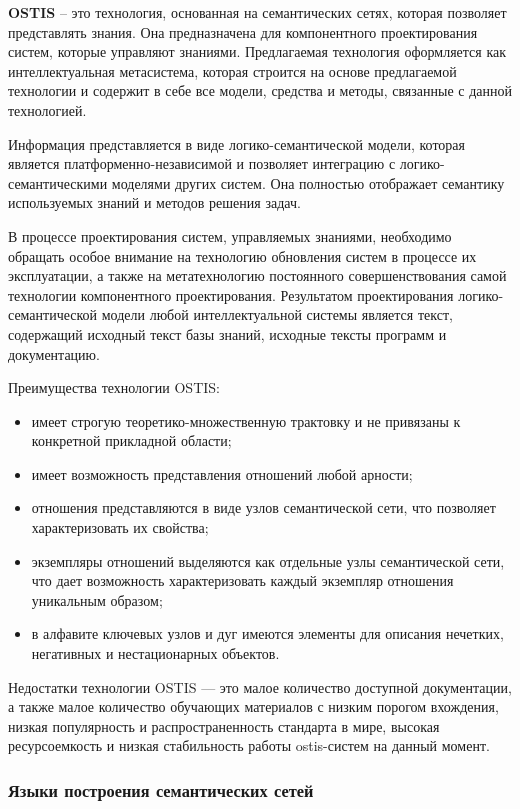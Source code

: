 \textbf{OSTIS} -- это технология, основанная на семантических сетях, которая позволяет представлять знания. Она предназначена для компонентного проектирования систем, которые управляют знаниями. Предлагаемая технология оформляется как интеллектуальная метасистема, которая строится на основе предлагаемой технологии и содержит в себе все модели, средства и методы, связанные с данной технологией.

Информация представляется в виде логико-семантической модели, которая является платформенно-независимой и позволяет интеграцию с логико-семантическими моделями других систем. Она полностью отображает семантику используемых знаний и методов решения задач.

В процессе проектирования систем, управляемых знаниями, необходимо обращать особое внимание на технологию обновления систем в процессе их эксплуатации, а также на метатехнологию постоянного совершенствования самой технологии компонентного проектирования. Результатом проектирования логико-семантической модели любой интеллектуальной системы является текст, содержащий исходный текст базы знаний, исходные тексты программ и документацию. \cite{Model_Shunkevich}

Преимущества технологии OSTIS:
\begin{itemize}
    \item имеет строгую теоретико-множественную трактовку и не привязаны к конкретной прикладной области;
    \item имеет возможность представления отношений любой арности;
    \item отношения представляются в виде узлов семантической сети, что позволяет характеризовать их свойства;
    \item экземпляры отношений выделяются как отдельные узлы семантической сети, что дает возможность характеризовать каждый экземпляр отношения уникальным образом;
    \item в алфавите ключевых узлов и дуг имеются элементы для описания нечетких, негативных и нестационарных объектов. \cite{Kaeshko}
\end{itemize}

Недостатки технологии OSTIS --- это малое количество доступной документации, а также малое количество обучающих материалов с низким порогом вхождения, низкая популярность и распространенность стандарта в мире, высокая ресурсоемкость и низкая стабильность работы ostis-систем на данный момент.

\subsubsection{Языки построения семантических сетей}

